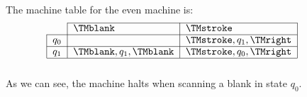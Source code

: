 \documentclass[../../include/open-logic-section]{subfiles}
\begin{document}
\begin{ex}
The machine table for the even machine is:
\[
\centering
\begin{tabular}{lllll}
\cline{2-3}
\multicolumn{1}{l|}{}      & \multicolumn{1}{l|}{$\TMblank$}                
& \multicolumn{1}{l|}{$\TMstroke$}                &  &  \\ \cline{1-3}
\multicolumn{1}{|l|}{$q_0$} & \multicolumn{1}{l|}{}                          
& \multicolumn{1}{l|}{$\TMstroke, q_1, \TMright$} &  &  \\ \cline{1-3}
\multicolumn{1}{|l|}{$q_1$} & \multicolumn{1}{l|}{$\TMblank, q_1, \TMblank$} 
& \multicolumn{1}{l|}{$\TMstroke, q_0, \TMright$} &  &  \\ \cline{1-3}
                           &                                                &                                                 &  & 
\end{tabular}
\]
As we can see, the machine halts when scanning a blank in state $q_0$.
\end{ex}
\end{document}
